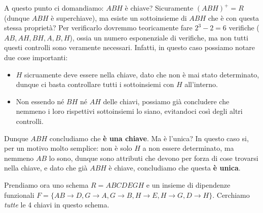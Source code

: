 \documentclass[11pt, a4paper, titlepage, oneside]{scrbook}
\begin{document}
A questo punto ci domandiamo: $ABH$ è chiave? Sicuramente $(ABH)^+ = R$ (dunque $ABH$ è superchiave), ma esiste un sottoinsieme di $ABH$ che è con questa stessa proprietà? Per verificarlo dovremmo teoricamente fare $2^3 - 2 = 6$ verifiche ($AB, AH, BH, A, B, H$), ossia un numero esponenziale di verifiche, ma non tutti questi controlli sono veramente necessari. Infatti, in questo caso possiamo notare due cose importanti:
\begin{itemize}
    \item $H$ sicruamente deve essere nella chiave, dato che non è mai stato determinato, dunque ci basta controllare tutti i sottoinsiemi con $H$ all'interno.
    \item Non essendo né $BH$ né $AH$ delle chiavi, possiamo già concludere che nemmeno i loro rispettivi sottoinsiemi lo siano, evitandoci così degli altri controlli.
\end{itemize}

Dunque $ABH$ concludiamo che \textbf{è una chiave}. Ma è l'unica? In questo caso si, per un motivo molto semplice: non è solo $H$ a non essere determinato, ma nemmeno $AB$ lo sono, dunque sono attributi che devono per forza di cose trovarsi nella chiave, e dato che già $ABH$ è chiave, concludiamo che questa \textbf{è unica}.

Prendiamo ora uno schema $R = ABCDEGH$ e un insieme di dipendenze funzionali $F = \{AB \longrightarrow D, G \longrightarrow A, G \longrightarrow B, H \longrightarrow E, H \longrightarrow G, D \longrightarrow H\}$. Cerchiamo \textit{tutte} le 4 chiavi in questo schema. 
\end{document}
